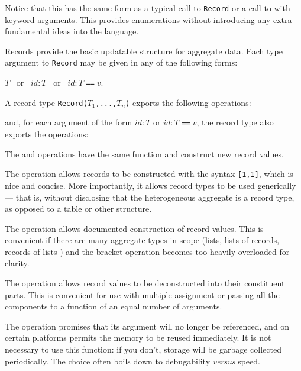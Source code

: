 Notice that this has the same form as a typical call to \verb+Record+
or a call to \ttin{->} with keyword arguments.
This provides enumerations without introducing 
any extra fundamental ideas into the language.

%
%
%
Records provide the basic updatable structure for aggregate data. Each type argument to \verb"Record" may be given in any of the following forms:

$ T $ \, or \,
$ id : T $ \, or \,
$ id : T $ \verb"=="$\; v $.

A record type 
{\tt Record($T_1$,...,$T_n$)}
exports the following operations:


and, for each argument of the form 
$ id : T $ or
$ id : T $ \verb"=="$\; v $,
the record type also exports the operations:


The  and  operations have the same function
and construct new record values.  

The  operation allows
records to be constructed with the syntax \verb"[1,1]", which is nice
and concise.
More importantly, it allows record types to be used generically --- that
is, without disclosing that the heterogeneous aggregate
is a record type, as opposed to a table or other structure.

The   operation allows documented construction
of record values.  
This is convenient if there are many aggregate types in scope
(lists, lists of records, records of lists \etc)
and the bracket operation becomes too heavily overloaded for clarity.

The  operation allows record values to be deconstructed
into their constituent parts.  This is convenient for use with
multiple assignment or passing all the components to a function of
an equal number of arguments.

The  operation promises that its argument will
no longer be referenced,
and on certain platforms permits the memory to be reused immediately.
It is not necessary to use this function:
if you don't, storage will be garbage collected periodically.
The choice often boils down to debugability {\em versus} speed.

